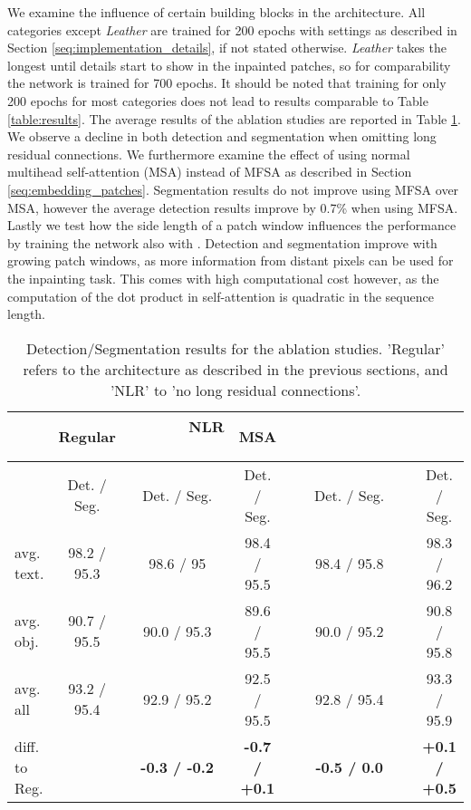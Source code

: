 \documentclass[runningheads]{llncs}
\begin{document}
We examine the influence of certain building blocks in the architecture. All categories except \textit{Leather} are trained for 200 epochs with settings as described in Section \ref{seq:implementation_details}, if not stated otherwise. \textit{Leather} takes the longest until details start to show in the inpainted patches, so for comparability the network is trained for 700 epochs. It should be noted that training for only 200 epochs for most categories does not lead to results comparable to Table \ref{table:results}. The average results of the ablation studies are reported in Table \ref{table:ablation}. We observe a decline in both detection and segmentation when omitting long residual connections. We furthermore examine the effect of using  normal multihead self-attention (MSA) instead of MFSA as described in Section \ref{seq:embedding_patches}. Segmentation results do not improve using MFSA over MSA, however the average detection results improve by 0.7\% when using MFSA. Lastly we test how the side length  of a patch window influences the performance by training the network also with . Detection and segmentation improve with growing patch windows, as more information from distant pixels can be used for the inpainting task. This comes with high computational cost however, as the computation of the dot product in self-attention is quadratic in the sequence length.

\begin{table}[t]
	\caption{Detection/Segmentation results for the ablation studies. 'Regular' refers to the architecture as described in the previous sections, and 'NLR' to 'no long residual connections'. }
	\label{table:ablation}
	\begin{center}
		\begin{tabular}{l | c c c c c}
			\hline
			& Regular & \ \ \ \ \ \ \ NLR \ \ \ \ \ \ & MSA & \ \ \ \ \ \ \  \ \ \ \ \ \ \  &  \\
			\hline \hline
			& Det. / Seg. & Det. / Seg. & Det. / Seg. & Det. / Seg. & Det. / Seg. \\
			avg. text. & 98.2 / 95.3 & 98.6 / 95 & 98.4 / 95.5 & 98.4 / 95.8 & 98.3 / 96.2 \\
			\hline
			avg. obj. & 90.7 / 95.5 & 90.0 / 95.3 & 89.6 / 95.5 & 90.0 / 95.2 & 90.8 / 95.8 \\
			\hline
			avg. all & 93.2 / 95.4 & 92.9 / 95.2 & 92.5 / 95.5 & 92.8 / 95.4 & 93.3 / 95.9 \\
			\hline
			diff. to Reg. & & \textbf{-0.3 / -0.2} & \textbf{-0.7 / +0.1} & \textbf{-0.5 / 0.0} & \textbf{+0.1 / +0.5} \\
		\end{tabular}
	\end{center}
\end{table}
\end{document}
